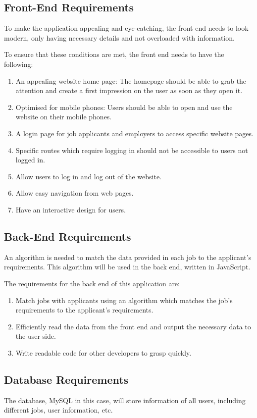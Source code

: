 \subsection{Front-End Requirements}
To make the application appealing and eye-catching, the front end needs to look modern, only having necessary details and not overloaded with information.

To ensure that these conditions are met, the front end needs to have the \break following:
\begin{enumerate}
    \item An appealing website home page: The homepage should be able to grab the attention and create a first impression on the user as soon as they open it. 
    \item Optimised for mobile phones: Users should be able to open and use the website on their mobile phones.
    \item A login page for job applicants and employers to access specific website pages.
    \item Specific routes which require logging in should not be accessible to users not logged in.
    \item Allow users to log in and log out of the website.
    \item Allow easy navigation from web pages.
    \item Have an interactive design for users.
\end{enumerate}

\subsection{Back-End Requirements}
An algorithm is needed to match the data provided in each job to the applicant's requirements. This algorithm will be used in the back end, written in JavaScript.

The requirements for the back end of this application are:
\begin{enumerate}
    \item Match jobs with applicants using an algorithm which matches the job's requirements to the applicant's requirements.
    \item Efficiently read the data from the front end and output the necessary data to the user side.
    \item Write readable code for other developers to grasp quickly.
\end{enumerate}

\subsection{Database Requirements}
The database, MySQL in this case, will store information of all users, including different jobs, user information, etc. 

